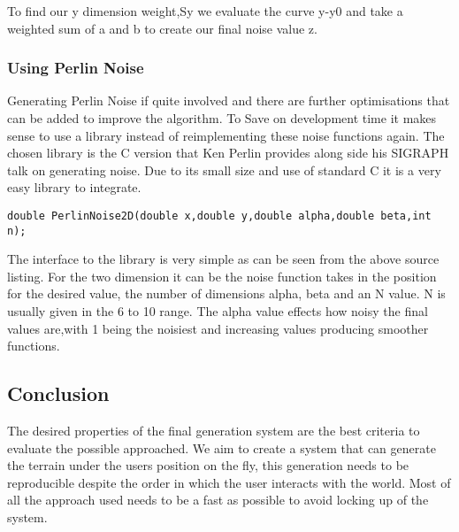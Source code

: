 To find our y dimension weight,Sy we evaluate the curve y-y0 and take a weighted sum
of a and b to create our final noise value z.\\

\subsubsection*{Using Perlin Noise}
Generating Perlin Noise if quite involved and there are further optimisations that
can be added to improve the algorithm. To Save on development time it makes sense to
use a library instead of reimplementing these noise functions again. The chosen 
library is the C version that Ken Perlin provides along side his SIGRAPH talk on 
generating noise. Due to its small size and use of standard C it is a very easy 
library to integrate.\\

\begin{lstlisting}
double PerlinNoise2D(double x,double y,double alpha,double beta,int n);
\end{lstlisting}

The interface to the library is very simple as can be seen from the above source
listing.
For the two dimension it can be the noise function takes in the 
position for the desired value, the number of dimensions alpha, beta and an N value.
N is usually given
in the 6 to 10 range. The alpha value effects how noisy the final values are,with
1 being the noisiest and increasing values producing smoother functions.\\

\subsection{Conclusion}
The desired properties of the final generation system are the best criteria to
evaluate the possible approached. We aim to create a system that can generate
the terrain under the users position on the fly, this generation needs to be
reproducible despite the order in which the user interacts with the world. Most
of all the approach used needs to be a fast as possible to avoid locking up of
the system.\\

